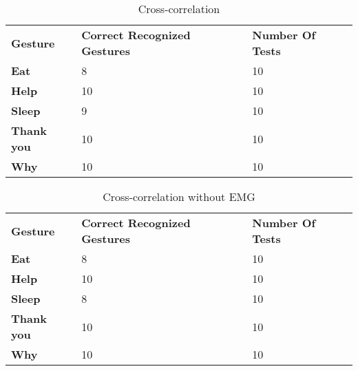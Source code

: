 \begin{table}[ht!]
\centering
    \begin{tabular}{ | l | p{4cm} | p{4cm}|}
        \hline
        \textbf{Gesture} & \textbf{Correct Recognized Gestures} & \textbf{Number Of Tests} \\ \Xhline{4\arrayrulewidth}
        
        \textbf{Eat} & 8 &  10 \\ \hline
        
        \textbf{Help}  & 10 &  10 \\ \hline
        
        \textbf{Sleep}  & 9 &  10 \\ \hline
        
        \textbf{Thank you}  & 10 &  10 \\ \hline
        
        \textbf{Why}  & 10 &  10 \\ \hline
    \end{tabular}
    \caption[Cross-correlation test]{Cross-correlation}
    \label{table:cross_correlation_test}
\end{table}

\begin{table}[ht!]
\centering
    \begin{tabular}{ | l | p{4cm} | p{4cm}|}
        \hline
        \textbf{Gesture} & \textbf{Correct Recognized Gestures} & \textbf{Number Of Tests} \\ \Xhline{4\arrayrulewidth}
        
        \textbf{Eat} & 8 &  10 \\ \hline
        
        \textbf{Help}  & 10 &  10 \\ \hline
        
        \textbf{Sleep}  & 8 &  10 \\ \hline
        
        \textbf{Thank you}  & 10 &  10 \\ \hline
        
        \textbf{Why}  & 10 &  10 \\ \hline
    \end{tabular}
    \caption[Cross-correlation without EMG test]{Cross-correlation without EMG}
    \label{table:cross_correlation_without_EMG_test}
\end{table}


